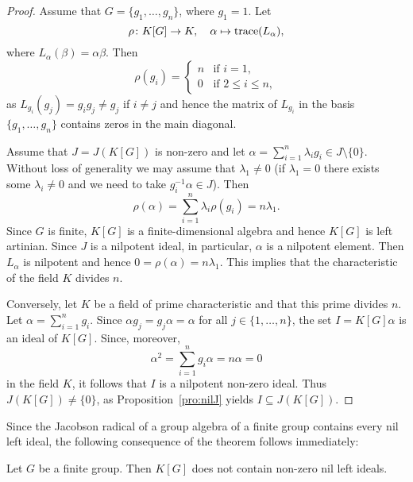 \begin{proof}
	Assume that $G=\{g_1,\dots,g_n\}$, where $g_1=1$. Let 
	\[
	\rho\colon K[G]\to K,
	\quad
	\alpha\mapsto\operatorname{trace}(L_{\alpha}),
	\]
	where 
	$L_{\alpha}(\beta)=\alpha\beta$. Then 
	\[
	\rho(g_i)=\begin{cases}
	    n & \text{if $i=1$,}\\
	    0 & \text{if $2\leq i\leq n$},
	\end{cases}
	\]
	as $L_{g_i}(g_j)=g_{i}g_j\ne g_j$ if $i\ne j$ and hence the matrix of 
	$L_{g_i}$ in the basis $\{g_1,\dots,g_n\}$ contains zeros in the main diagonal.

	Assume that $J=J(K[G])$ is non-zero and let 
	$\alpha=\sum_{i=1}^n\lambda_ig_i\in J\setminus\{0\}$. Without loss of generality
	we may assume that $\lambda_1\ne 0$ (if $\lambda_1=0$ there exists some 
	$\lambda_i\ne 0$ and we need to take $g_i^{-1}\alpha\in J$). Then 
	\[
		\rho(\alpha)=\sum_{i=1}^n \lambda_i\rho(g_i)=n\lambda_1.
	\]
	Since $G$ is finite, $K[G]$ is a finite-dimensional algebra and hence 
	$K[G]$ is left artinian. Since $J$ is a nilpotent ideal, 
	in particular, $\alpha$ is a nilpotent element. Then 
	$L_{\alpha}$ is nilpotent and hence $0=\rho(\alpha)=n\lambda_1$. This implies that
	the characteristic of the field $K$ divides $n$. 

	Conversely, let $K$ be a field of prime characteristic and that this prime divides 
	$n$. Let $\alpha=\sum_{i=1}^ng_i$. Since $\alpha
	g_j=g_j\alpha=\alpha$ for all $j\in\{1,\dots,n\}$, the set 
	$I=K[G]\alpha$ is an ideal of $K[G]$. Since, moreover,   
	\[
		\alpha^2=\sum_{i=1}^n g_i\alpha=n\alpha=0
	\]
	in the field $K$, it follows that $I$ is a nilpotent non-zero ideal. Thus $J(K[G])\ne\{0\}$, 
	as Proposition~\ref{pro:nilJ} yields $I\subseteq J(K[G])$.
\end{proof}

Since the Jacobson radical of a group algebra of a finite group contains 
every nil left ideal, the following consequence of the theorem follows immediately:

\begin{corollary}
	\label{cor:GfinitoNOnil}
	Let $G$ be a finite group. Then $K[G]$ does not contain non-zero nil left ideals. 
\end{corollary}



